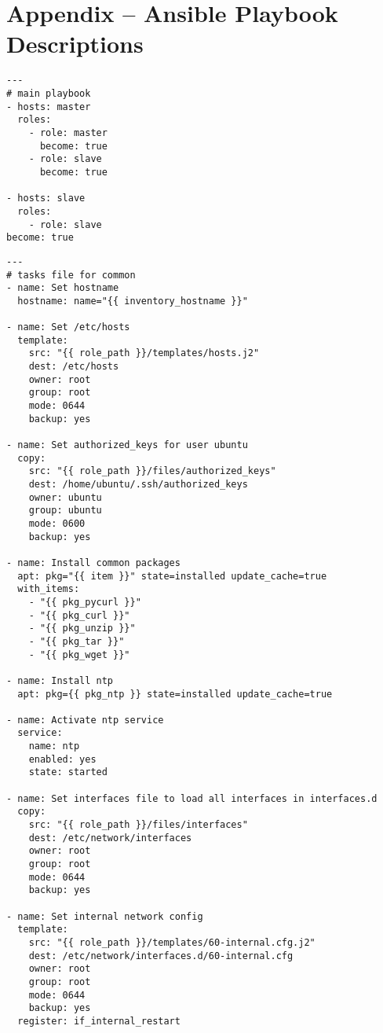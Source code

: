 
\chapter{Appendix -- Ansible Playbook Descriptions}

\lstset{language=sh}
\begin{lstlisting}[caption={Ansible playbook that gets run to install the cluster system}, label={lst:ansibleall}]
---
# main playbook
- hosts: master
  roles:
    - role: master
      become: true
    - role: slave
      become: true

- hosts: slave
  roles:
    - role: slave
become: true
\end{lstlisting}

\lstset{language=sh}
\begin{lstlisting}[caption={Common tasks in Ansible}, label={lst:ansiblecommon}]
---
# tasks file for common
- name: Set hostname
  hostname: name="{{ inventory_hostname }}"

- name: Set /etc/hosts
  template:
    src: "{{ role_path }}/templates/hosts.j2"
    dest: /etc/hosts
    owner: root
    group: root
    mode: 0644
    backup: yes

- name: Set authorized_keys for user ubuntu
  copy:
    src: "{{ role_path }}/files/authorized_keys"
    dest: /home/ubuntu/.ssh/authorized_keys
    owner: ubuntu
    group: ubuntu
    mode: 0600
    backup: yes

- name: Install common packages
  apt: pkg="{{ item }}" state=installed update_cache=true
  with_items:
    - "{{ pkg_pycurl }}"
    - "{{ pkg_curl }}"
    - "{{ pkg_unzip }}"
    - "{{ pkg_tar }}"
    - "{{ pkg_wget }}"

- name: Install ntp
  apt: pkg={{ pkg_ntp }} state=installed update_cache=true

- name: Activate ntp service
  service:
    name: ntp
    enabled: yes
    state: started

- name: Set interfaces file to load all interfaces in interfaces.d
  copy:
    src: "{{ role_path }}/files/interfaces"
    dest: /etc/network/interfaces
    owner: root
    group: root
    mode: 0644
    backup: yes

- name: Set internal network config
  template:
    src: "{{ role_path }}/templates/60-internal.cfg.j2"
    dest: /etc/network/interfaces.d/60-internal.cfg
    owner: root
    group: root
    mode: 0644
    backup: yes
  register: if_internal_restart


\end{lstlisting}
